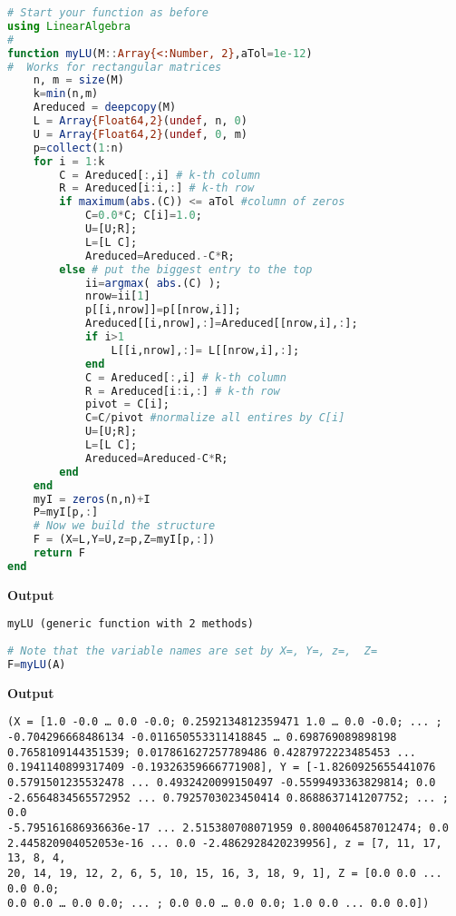 \begin{lstlisting}[language=Julia,style=mystyle]
# Start your function as before
using LinearAlgebra
#
function myLU(M::Array{<:Number, 2},aTol=1e-12)
#  Works for rectangular matrices  
    n, m = size(M)
    k=min(n,m)
    Areduced = deepcopy(M)
    L = Array{Float64,2}(undef, n, 0)
    U = Array{Float64,2}(undef, 0, m)
    p=collect(1:n)     
    for i = 1:k
        C = Areduced[:,i] # k-th column
        R = Areduced[i:i,:] # k-th row
        if maximum(abs.(C)) <= aTol #column of zeros
            C=0.0*C; C[i]=1.0;
            U=[U;R];  
            L=[L C];
            Areduced=Areduced.-C*R;
        else # put the biggest entry to the top  
            ii=argmax( abs.(C) );
            nrow=ii[1] 
            p[[i,nrow]]=p[[nrow,i]];
            Areduced[[i,nrow],:]=Areduced[[nrow,i],:];
            if i>1
                L[[i,nrow],:]= L[[nrow,i],:];
            end
            C = Areduced[:,i] # k-th column
            R = Areduced[i:i,:] # k-th row
            pivot = C[i];
            C=C/pivot #normalize all entires by C[i]
            U=[U;R]; 
            L=[L C];
            Areduced=Areduced-C*R;
        end
    end
    myI = zeros(n,n)+I
    P=myI[p,:]
    # Now we build the structure
    F = (X=L,Y=U,z=p,Z=myI[p,:])
    return F
end
\end{lstlisting}
\textbf{Output} 
\begin{verbatim}
myLU (generic function with 2 methods)
\end{verbatim}



\begin{lstlisting}[language=Julia,style=mystyle]
# Note that the variable names are set by X=, Y=, z=,  Z=
F=myLU(A)
\end{lstlisting}
\textbf{Output} 
\begin{verbatim}
(X = [1.0 -0.0 … 0.0 -0.0; 0.2592134812359471 1.0 … 0.0 -0.0; ... ;
-0.704296668486134 -0.011650553311418845 … 0.698769089898198
0.7658109144351539; 0.017861627257789486 0.4287972223485453 ...
0.1941140899317409 -0.19326359666771908], Y = [-1.8260925655441076
0.5791501235532478 ... 0.4932420099150497 -0.5599493363829814; 0.0
-2.6564834565572952 ... 0.7925703023450414 0.8688637141207752; ... ; 0.0
-5.795161686936636e-17 ... 2.515380708071959 0.8004064587012474; 0.0
2.445820904052053e-16 ... 0.0 -2.4862928420239956], z = [7, 11, 17, 13, 8, 4,
20, 14, 19, 12, 2, 6, 5, 10, 15, 16, 3, 18, 9, 1], Z = [0.0 0.0 ... 0.0 0.0; 
0.0 0.0 … 0.0 0.0; ... ; 0.0 0.0 … 0.0 0.0; 1.0 0.0 ... 0.0 0.0])
\end{verbatim}



